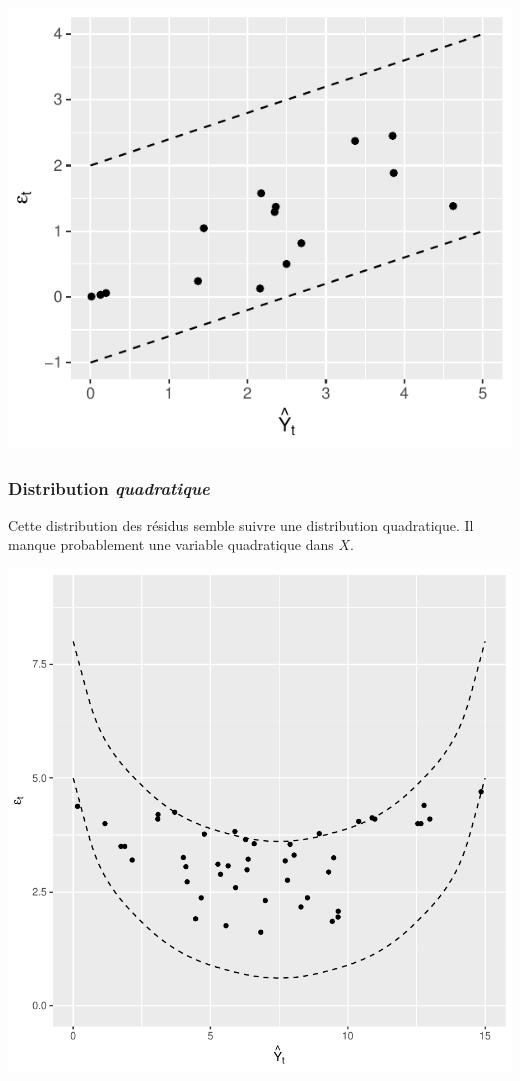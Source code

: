 \documentclass[11pt,french]{report}
\begin{document}
\bigskip
\includegraphics{notes_de_cours-032}
\bigskip

\subsubsection{Distribution \emph{quadratique}}
Cette distribution des résidus semble suivre une distribution quadratique. Il manque probablement une variable quadratique dans $X$.

\bigskip
\includegraphics{notes_de_cours-033}
\end{document}

